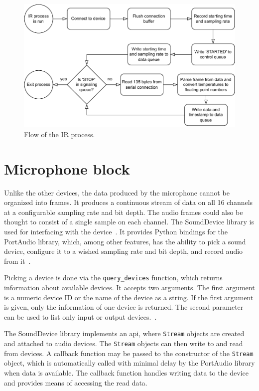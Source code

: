 \begin{figure}
    \centering
    \includegraphics[width=\textwidth]{fig/3/ir-flowchart.pdf}
    \caption{Flow of the IR process.}
    \label{fig:3-ir-flowchart}
\end{figure}

\section{Microphone block}
\label{sec:3-mic}
Unlike the other devices, the data produced by the microphone cannot be organized into frames.
It produces a continuous stream of data on all 16 channels at a configurable sampling rate and bit depth.
The audio frames could also be thought to consist of a single sample on each channel.
The SoundDevice library is used for interfacing with the device~\cite{sounddevice-docs}.
It provides Python bindings for the PortAudio library,
which, among other features, has the ability to pick a sound device,
configure it to a wished sampling rate and bit depth, and record audio from it~\cite{portaudio}.

Picking a device is done via the \texttt{query\_devices} function,
which returns information about available devices.
It accepts two arguments.
The first argument is a numeric device ID or the name of the device as a string.
If the first argument is given, only the information of one device is returned.
The second parameter can be used to list only input or output devices.~\cite{sounddevice-docs}.

The SoundDevice library implements an \gls{api}, where \texttt{Stream} objects are created and attached to audio devices.
The \texttt{Stream} objects can then write to and read from devices.
A callback function may be passed to the constructor of the \texttt{Stream} object,
which is automatically called with minimal delay by the PortAudio library when data is available.
The callback function handles writing data to the device and provides means of accessing the read data.~\cite{sounddevice-docs-stream}

